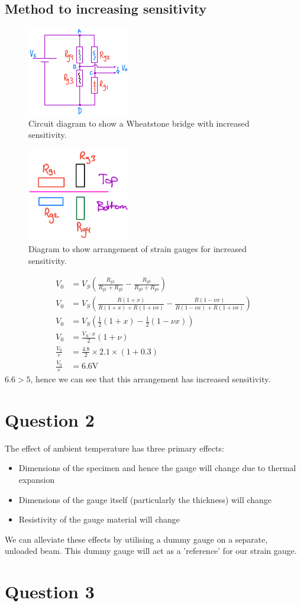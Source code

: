 \documentclass[12pt]{article}
\numberwithin{equation}{section}
\begin{document}
\subsection*{Method to increasing sensitivity}
\begin{figure}[H]
  \centering
  \includegraphics[width=0.4\textwidth]{./img/4-4circuit.png}
  \caption{Circuit diagram to show a Wheatstone bridge with increased sensitivity.}
\end{figure}
\begin{figure}[H]
  \centering
  \includegraphics[width=0.4\textwidth]{./img/4-4arrangement.png}
  \caption{Diagram to show arrangement of strain gauges for increased sensitivity.}
\end{figure}
\begin{align}
  V_0 &= V_S \left(\frac{R_{g1}}{R_{g1} + R_{g2}} - \frac{R_{g3}}{R_{g3} + R_{g4}}\right)\\
  V_0 &= V_S \left(\frac{R(1+x)}{R(1+x) + R(1+\nu x)} - \frac{R(1-\nu x)}{R(1-\nu x) + R(1+\nu x)}\right)\\
  V_0 &= V_S \left(\frac{1}{2}(1+x) - \frac{1}{2}(1-\nu x)\right)\\
  V_0 &= \frac{V_S \cdot x}{2} \left(1 + \nu \right)\\
  \frac{V_0}{e} &= \frac{4.8}{2} \times 2.1\times  (1 + 0.3)\\
  \frac{V_0}{e} &= 6.6 \si{\volt}
\end{align}
$6.6 > 5$, hence we can see that this arrangement has increased sensitivity.
\section{Question 2}
The effect of ambient temperature has three primary effects:
\begin{itemize}
  \item Dimensions of the specimen and hence the gauge will change due to thermal expansion
  \item Dimensions of the gauge itself (particularly the thickness) will change
  \item Resistivity of the gauge material will change
\end{itemize}
We can alleviate these effects by utilising a dummy gauge on a separate, unloaded beam. This dummy gauge will act as a 'reference' for our strain gauge.
\section{Question 3}
\end{document}
